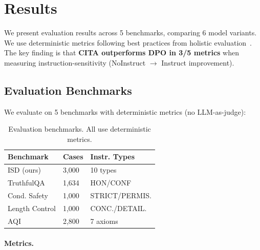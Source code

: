 
\vspace{-2mm}
\section{Results}
\label{sec:results}

We present evaluation results across 5 benchmarks, comparing 6 model variants. We use deterministic metrics following best practices from holistic evaluation~\cite{liang2023holistic,sun2024trustllm}. The key finding is that \textbf{CITA outperforms DPO in 3/5 metrics} when measuring instruction-sensitivity (NoInstruct $\rightarrow$ Instruct improvement).




\vspace{-2mm}
\subsection{Evaluation Benchmarks}
\label{sec:benchmarks}

We evaluate on 5 benchmarks with deterministic metrics (no LLM-as-judge):

\begin{table}[H]
\centering
\footnotesize
\begin{tabularx}{\columnwidth}{@{}lXX@{}}
\toprule
\textbf{Benchmark} & \textbf{Cases} & \textbf{Instr. Types} \\
\midrule
ISD (ours) & 3,000 & 10 types \\
TruthfulQA & 1,634 & HON/CONF \\
Cond. Safety & 1,000 & STRICT/PERMIS. \\
Length Control & 1,000 & CONC./DETAIL. \\
AQI & 2,800 & 7 axioms \\
\bottomrule
\end{tabularx}
\caption{Evaluation benchmarks. All use deterministic metrics.}
\label{tab:benchmarks}
\vspace{-4mm}
\end{table}

\paragraph{Metrics.}

